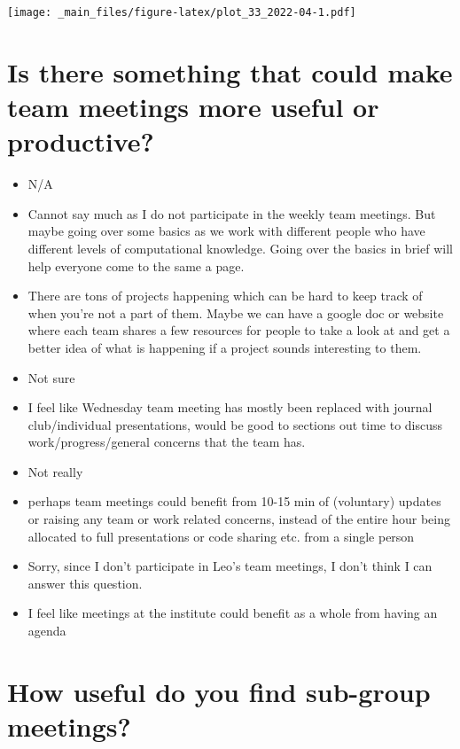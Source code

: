 \documentclass[
]{book}
\providecommand{\tightlist}{%
  \setlength{\itemsep}{0pt}\setlength{\parskip}{0pt}}
\begin{document}
\texttt{[image: \_main\_files/figure-latex/plot\_33\_2022-04-1.pdf]}

\hypertarget{is-there-something-that-could-make-team-meetings-more-useful-or-productive}{%
\section{Is there something that could make team meetings more useful or productive?}\label{is-there-something-that-could-make-team-meetings-more-useful-or-productive}}

\begin{itemize}
\tightlist
\item
  N/A
\item
  Cannot say much as I do not participate in the weekly team meetings. But maybe going over some basics as we work with different people who have different levels of computational knowledge. Going over the basics in brief will help everyone come to the same a page.
\item
  There are tons of projects happening which can be hard to keep track of when you're not a part of them. Maybe we can have a google doc or website where each team shares a few resources for people to take a look at and get a better idea of what is happening if a project sounds interesting to them.
\item
  Not sure
\item
  I feel like Wednesday team meeting has mostly been replaced with journal club/individual presentations, would be good to sections out time to discuss work/progress/general concerns that the team has.
\item
  Not really
\item
  perhaps team meetings could benefit from 10-15 min of (voluntary) updates or raising any team or work related concerns, instead of the entire hour being allocated to full presentations or code sharing etc. from a single person
\item
  Sorry, since I don't participate in Leo's team meetings, I don't think I can answer this question.
\item
  I feel like meetings at the institute could benefit as a whole from having an agenda
\end{itemize}

\hypertarget{how-useful-do-you-find-sub-group-meetings}{%
\section{How useful do you find sub-group meetings?}\label{how-useful-do-you-find-sub-group-meetings}}
\end{document}
